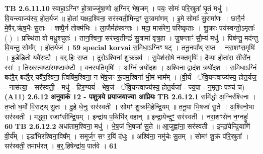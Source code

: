 \documentclass[17pt]{extarticle}
\begin{document}
                  \newline
                                \textbf{ TB 2.6.11.10} \newline
                  स्वाहा॒ऽग्निꣳ हो॒त्राज्जु॑षा॒णो अ॒ग्निर् भे॑ष॒जम् । पयः॒ सोमः॑ परि॒स्रुता॑ घृ॒तं मधु॑ । वि॒यन्त्वाज्य॑स्य॒ होत॒र्यज॑ ॥ होता॑ यक्षद॒श्विना॒ सर॑स्वती॒मिन्द्रꣳ॑ सु॒त्रामा॑णम् । इ॒मे सोमाः᳚ सु॒रामा॑णः । छागै॒र्न मे॒षैर्.ऋ॑ष॒भैः सु॒ताः । शष्पै॒र्न तोक्म॑भिः । ला॒जैर्मह॑स्वन्तः । मदा॒ मास॑रेण॒ परि॑ष्कृताः । शु॒क्राः पय॑स्वन्तो॒ऽमृताः᳚ ( ) । प्रस्थि॑ता वो मधु॒श्चुतः॑ । तान॒श्विना॒ सर॑स्व॒तीन्द्रः॑ सु॒त्रामा॑ वृत्र॒हा । जु॒षन्ताꣳ॑ सौ॒म्यं मधु॑ । पिब॑न्तु॒ मद॑न्तु वि॒यन्तु॒ सोम᳚म् । होत॒र्यज॑ । \textbf{ 59} \newline
                  \newline
                                                        \textbf{special korvai} \newline
              स॒मिधा॒ऽग्निꣳ षट् । तनू॒नपा᳚थ् स॒प्त । नरा॒शꣳस॒मृषिः॑ । इ॒डेडि॒तो यवै॑र॒ष्टौ । ब॒र्॒.हिः स॒प्त । दुरो॒ऽश्विना॑ शु॒क्रन्नव॑ । सु॒पेश॑सो॒षे नक्त॒मृषिः॑। दैव्या॒ होता॑रा॒ सीसे॑न॒ रसः॑ । ति॒स्रस्त्वष्टा॑रम॒ष्टाव॑ष्टौ । वन॒स्पति॒मृषिः॑ । अ॒ग्निं त्रयो॑दश । अ॒श्विना॒ द्वाद॑श॒ त्रयो॑दश । स॒मिधा॒ऽग्निं बद॑रै॒र् बद॑रै॒र् यवै॑र॒श्विना॒ त्विषि॑म॒श्विना॒ न भे॑ष॒जꣳ रू॒पम॒श्विना॑ भी॒मं भाम᳚म् । \newline
                                (वी॒र्यं - ॅवि॒यन्त्वाज्य॑स्य॒ होत॒र्यज॒ - नास॑त्या॒ - सर॑स्वती॒ - मधु॑ - हिर॒ण्ययं॑ - भेष॒जं - ॅवि॒यन्त्वाज्य॑स्य॒ होत॒र्यजा᳚ - ज्य॒पा - न॒मृताः॒ पञ्च॑ च) \textbf{(A11)} \newline \newline
                \textbf{ 2.6.12    अनुवाकं   12 - पशुत्रये प्रयाजयाज्या आप्रियः} \newline
                                \textbf{ TB 2.6.12.1} \newline
                  समि॑द्धो अ॒ग्निर॑श्विना । त॒प्तो घ॒र्मो वि॒राट्थ् सु॒तः । दु॒हे धे॒नुः सर॑स्वती । सोमꣳ॑ शु॒क्रमि॒हेन्द्रि॒यम् ॥ त॒नू॒पा भि॒षजा॑ सु॒ते । अ॒श्विनो॒भा सर॑स्वती । मद्ध्वा॒ रजाꣳ॑सीन्द्रि॒यम् । इन्द्रा॑य प॒थिभि॑र् वहान् ॥ इन्द्रा॒येन्दुꣳ॒॒ सर॑स्वती । नरा॒शꣳसे॑न न॒ग्नहुः॑ \textbf{ 60} \newline
                  \newline
                                \textbf{ TB 2.6.12.2} \newline
                  अधा॑ताम॒श्विना॒ मधु॑ । भे॒ष॒जं भि॒षजा॑ सु॒ते ॥ आ॒जुह्वा॑ना॒ सर॑स्वती । इन्द्रा॑येन्द्रि॒याणि॑ वी॒र्य᳚म् । इडा॑भिरश्विना॒विष᳚म् । समूर्जꣳ॒॒ सꣳ र॒यिं द॑धुः ॥ अश्वि॑ना॒ नमु॑चेः सु॒तम् । सोमꣳ॑ शु॒क्रं प॑रि॒स्रुता᳚ । सर॑स्वती॒ तमाभ॑रत् । ब॒र्॒.हिषेन्द्रा॑य॒ पात॑वे । \textbf{ 61} \newline
\end{document}
